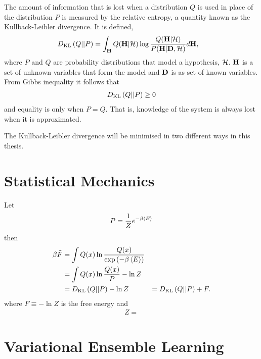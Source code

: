 {The amount of information that is lost when a distribution $Q$ is used in place of the distribution $P$ is measured by the relative entropy, 
a quantity known as the  Kullback-Leibler divergence.
It is defined,
\begin{align}
D_{\text {KL}}\left( {Q}||{P} \right) &= \int_{\mathbf{H}} Q(\mathbf{H}|{\cal H}) \log\frac{Q(\mathbf{H}|{\cal H})}{P(\mathbf{H}|\mathbf{D},{\cal H})} d\mathbf{H},
\end{align}
where $P$ and $Q$ are probability distributions that model a hypothesis, ${\cal H}$.
$\mathbf{H}$ is a set of unknown variables that form the model and $\mathbf{D}$ is as set of known variables.
From Gibbs inequality it follows that 
\begin{align}
D_{\text {KL}}\left( {Q}||{P} \right) \ge 0
\end{align}
and equality is only when $P=Q$.
That is, knowledge of the system is always lost when it is approximated.

The Kullback-Leibler divergence will be minimised in two different ways in this thesis.

\section{Statistical Mechanics}

  Let 
  \begin{align}
    P = \frac{1}{Z} e^{-\beta \left< E \right> }
  \end{align}
  then
  \begin{align}
    \beta \tilde{F} &= \int Q(x) \ln \frac{Q(x)}{\exp\left( -\beta \left< E \right>  \right)} \\
    &= \int Q(x) \ln \frac{Q(x)}{P} - \ln Z \\
    &= D_{\text {KL}}\left( {Q}||{P} \right) - \ln Z
    &= D_{\text {KL}}\left( {Q}||{P} \right) + F.
  \end{align}
  where $F \equiv  - \ln Z$ is the free energy and 
  \begin{align}
    Z = 
  \end{align}

\section{Variational Ensemble Learning}


}
